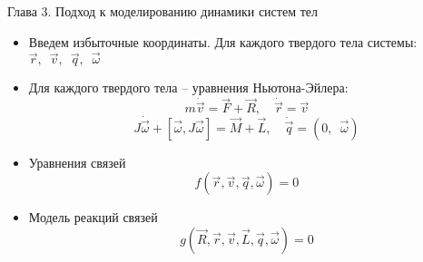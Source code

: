 \begin{frame}{Глава 3. Подход к моделированию динамики систем тел}
    \begin{itemize}
        \item {
            Введем избыточные координаты. Для каждого твердого тела системы: \quad
            $ \vec{r}, \enspace \vec{v}, \enspace \vec{q}, \enspace \vec{\omega} $
        }
        \item {
            Для каждого твердого тела -- уравнения Ньютона-Эйлера:
            $$ m\dot{\vec{v}} = \vec{F} + \vec{R}, \quad \dot{\vec{r}} = \vec{v} $$
            $$ J\dot{\vec{\omega}} + [ \vec{\omega}, J\vec{\omega} ] = \vec{M} + \vec{L}, \quad \dot{\vec{q}} = (0, \enspace \vec{\omega}) $$
        }
        \item {
            Уравнения связей
            \vspace{-15pt}
            $$ f(\vec{r}, \vec{v}, \vec{q}, \vec{\omega}) = 0 $$
        }
        \item {
            Модель реакций связей
            \vspace{-15pt}
            $$ g(\vec{R}, \vec{r}, \vec{v}, \vec{L}, \vec{q}, \vec{\omega}) = 0 $$
        }
    \end{itemize}
\end{frame}